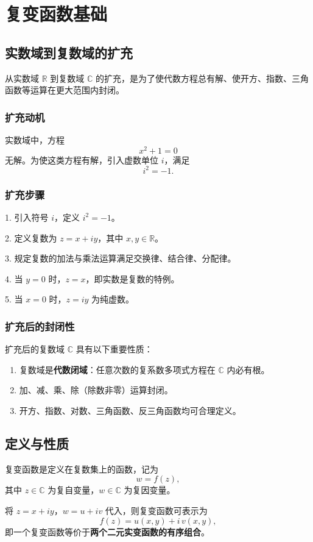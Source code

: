 \chapter{复变函数基础}

\section{实数域到复数域的扩充}
从实数域 $\mathbb{R}$ 到复数域 $\mathbb{C}$ 的扩充，是为了使代数方程总有解、使开方、指数、三角函数等运算在更大范围内封闭。

\subsection{扩充动机}
实数域中，方程
$$x^2 + 1 = 0$$
无解。为使这类方程有解，引入虚数单位 $i$，满足
$$i^2 = -1.$$

\subsection{扩充步骤}
\begin{tcolorbox}[title=复数的定义]
	1. 引入符号 $i$，定义 $i^2 = -1$。
	
	2. 定义复数为 $z = x + iy$，其中 $x,y\in\mathbb{R}$。
	
	3. 规定复数的加法与乘法运算满足交换律、结合律、分配律。
	
	4. 当 $y=0$ 时，$z = x$，即实数是复数的特例。
	
	5. 当 $x=0$ 时，$z = iy$ 为纯虚数。
\end{tcolorbox}

\subsection{扩充后的封闭性}
\begin{tcolorbox}[title=复数域的封闭性, colframe=gray!60!black, colback=gray!5!white]
	扩充后的复数域 $\mathbb{C}$ 具有以下重要性质：
	\begin{enumerate}
		\item 复数域是\textbf{代数闭域}：任意次数的复系数多项式方程在 $\mathbb{C}$ 内必有根。
		\item 加、减、乘、除（除数非零）运算封闭。
		\item 开方、指数、对数、三角函数、反三角函数均可合理定义。
	\end{enumerate}
\end{tcolorbox}

\section{定义与性质}
\begin{tcolorbox}[title=复变函数定义, colframe=blue!50!black, colback=blue!5!white]
	复变函数是定义在复数集上的函数，记为
	$$w = f(z),$$
	其中 $z\in\mathbb{C}$ 为复自变量，$w\in\mathbb{C}$ 为复因变量。
	
	将 $z=x+iy$，$w=u+iv$ 代入，则复变函数可表示为
	$$f(z) = u(x,y) + i\,v(x,y),$$
	即一个复变函数等价于\textbf{两个二元实变函数的有序组合}。
\end{tcolorbox}

